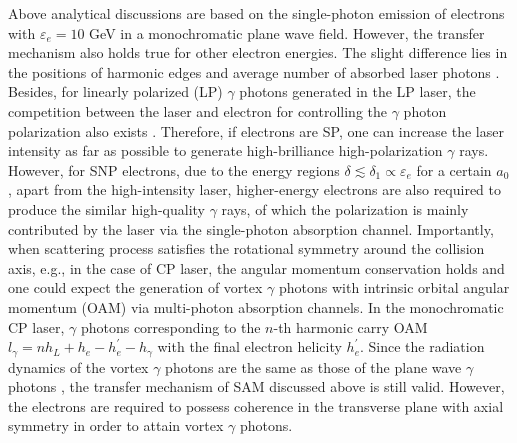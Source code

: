 \documentclass[10pt,twocolumn,showpacs,amsmath,amssymb,floatfix,superscriptaddress]{revtex4-2}
\begin{document}
Above analytical discussions are based on the single-photon emission of electrons with $\varepsilon_e =10$ GeV in a monochromatic plane wave field. However, the transfer mechanism also holds true for other electron energies. The slight difference lies in the positions of harmonic edges and average number of absorbed laser photons \cite{Supplemental}. Besides, for linearly polarized (LP) $\gamma$ photons generated in the LP laser, the competition between the laser and electron for controlling the $\gamma$ photon polarization also exists \cite{Supplemental}. Therefore, if electrons are SP, one can increase the laser intensity as far as possible to generate high-brilliance high-polarization $\gamma$ rays. However, for SNP electrons, due to the energy regions $\delta \lesssim \delta_1 \propto \varepsilon_{e}$ for a certain $a_0$, apart from the high-intensity laser, higher-energy electrons are also required to produce the similar high-quality $\gamma$ rays, of which the polarization is mainly contributed by the laser via the single-photon absorption channel. Importantly, when scattering process satisfies the rotational symmetry around the collision axis, e.g., in the case of CP laser, the angular momentum conservation holds and one could expect the generation of vortex $\gamma$ photons with intrinsic orbital angular momentum (OAM) via multi-photon absorption channels. In the monochromatic CP laser, $\gamma$ photons corresponding to the $n$-th harmonic carry OAM $l_\gamma=n h_L + h_e - h^\prime_{e}-h_\gamma$ with the final electron helicity $h^\prime_{e}$. Since the radiation dynamics of the vortex $\gamma$ photons are the same as those of the plane wave $\gamma$ photons \cite{Ababekri2022}, the transfer mechanism of SAM discussed above is still valid. However, the electrons are required to possess coherence in the transverse plane with axial symmetry in order to attain vortex $\gamma$ photons.   
\end{document}
